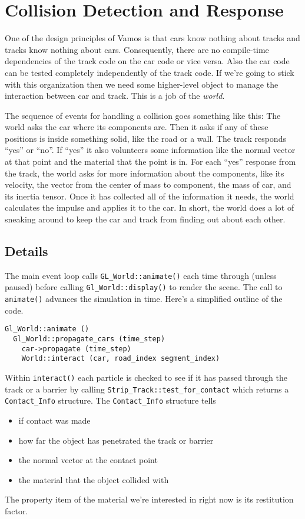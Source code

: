 \documentclass{article}
\begin{document}
\section{Collision Detection and Response}
One of the design principles of Vamos is that cars know nothing about
tracks and tracks know nothing about cars.  Consequently, there are no
compile-time dependencies of the track code on the car code or vice
versa.  Also the car code can be tested completely independently of
the track code.  If we're going to stick with this organization then
we need some higher-level object to manage the interaction between car
and track.  This is a job of the {\em world}.

The sequence of events for handling a collision goes something like
this:  The world asks the car where its components are.  Then it asks
if any of these positions is inside something solid, like the road or
a wall.  The track responds ``yes'' or ``no''.  If ``yes'' it also
volunteers some information like the normal vector at that point and
the material that the point is in.  For each ``yes'' response from the
track, the world asks for more information about the components, like
its velocity, the vector from the center of mass to component, the
mass of car, and its inertia tensor.  Once it has collected all of
the information it needs, the world calculates the impulse and applies
it to the car.  In short, the world does a lot of sneaking around to
keep the car and track from finding out about each other.

\subsection {Details}

The main event loop calls \verb#GL_World::animate()# each time
through (unless paused) before calling \verb#Gl_World::display()#
to render the scene.  The call to \verb#animate()# advances the
simulation in time.  Here's a simplified outline of the code.
\begin{verbatim}
Gl_World::animate ()
  Gl_World::propagate_cars (time_step)
    car->propagate (time_step)
    World::interact (car, road_index segment_index)
\end{verbatim}
Within \verb#interact()# each particle is checked to see if it has
passed through the track or a barrier by calling
\verb#Strip_Track::test_for_contact# which returns a
\verb#Contact_Info# structure.  The \verb#Contact_Info# structure
tells
\begin{itemize}
\item if contact was made
\item how far the object has penetrated the track or barrier
\item the normal vector at the contact point
\item the material that the object collided with
\end{itemize}
The property item of the material we're interested in right now is
its restitution factor.
\end{document}
